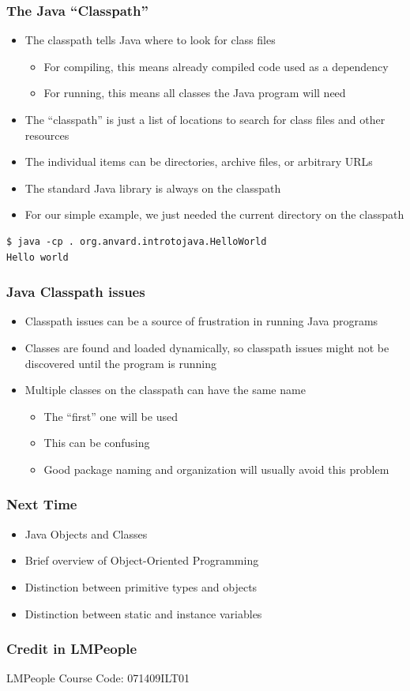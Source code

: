 \documentclass{beamer}
\begin{document}
\begin{frame}[fragile]
\frametitle{The Java ``Classpath''}
\begin{itemize}
\item The classpath tells Java where to look for class files
\begin{itemize}
\item For compiling, this means already compiled code used as a dependency
\item For running, this means all classes the Java program will need
\end{itemize}
\item The ``classpath'' is just a list of locations to search for class files and other resources
\item The individual items can be directories, archive files, or arbitrary URLs
\item The standard Java library is always on the classpath
\item For our simple example, we just needed the current directory on the classpath
\end{itemize}
\lstset{language=}
\begin{lstlisting}
$ java -cp . org.anvard.introtojava.HelloWorld
Hello world
\end{lstlisting}
\end{frame}

\begin{frame}
\frametitle{Java Classpath issues}
\begin{itemize}
\item Classpath issues can be a source of frustration in running Java programs
\item Classes are found and loaded dynamically, so classpath issues might not be discovered until the program is running
\item Multiple classes on the classpath can have the same name
\begin{itemize}
\item The ``first'' one will be used
\item This can be confusing
\item Good package naming and organization will usually avoid this problem
\end{itemize}
\end{itemize}
\end{frame}

\begin{frame}
\frametitle{Next Time}
\begin{itemize}
\item Java Objects and Classes
\item Brief overview of Object-Oriented Programming
\item Distinction between primitive types and objects
\item Distinction between static and instance variables
\end{itemize}
\end{frame}

\begin{frame}
\frametitle{Credit in LMPeople}
\begin{center}
LMPeople Course Code: 071409ILT01
\end{center}
\end{frame}
\end{document}
